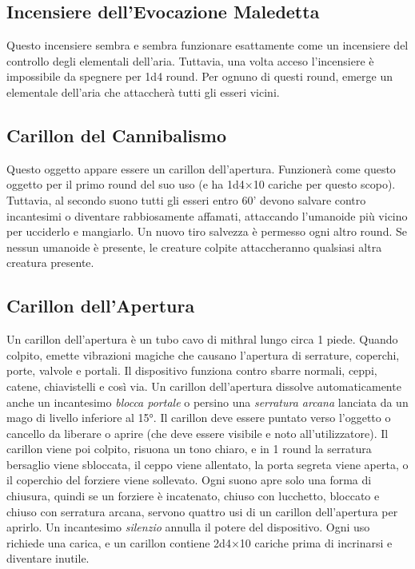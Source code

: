 \documentclass{article}
\begin{document}
\begin{multicols}{2}
\subsection{Incensiere dell'Evocazione Maledetta}
Questo incensiere sembra e sembra funzionare esattamente come un incensiere del controllo degli elementali dell'aria. Tuttavia, una volta acceso l'incensiere è impossibile da spegnere per 1d4 round. Per ognuno di questi round, emerge un elementale dell'aria che attaccherà tutti gli esseri vicini.

\subsection{Carillon del Cannibalismo}
Questo oggetto appare essere un carillon dell'apertura. Funzionerà come questo oggetto per il primo round del suo uso (e ha 1d4×10 cariche per questo scopo). Tuttavia, al secondo suono tutti gli esseri entro 60' devono salvare contro incantesimi o diventare rabbiosamente affamati, attaccando l'umanoide più vicino per ucciderlo e mangiarlo. Un nuovo tiro salvezza è permesso ogni altro round. Se nessun umanoide è presente, le creature colpite attaccheranno qualsiasi altra creatura presente.

\subsection{Carillon dell'Apertura}
Un carillon dell'apertura è un tubo cavo di mithral lungo circa 1 piede. Quando colpito, emette vibrazioni magiche che causano l'apertura di serrature, coperchi, porte, valvole e portali. Il dispositivo funziona contro sbarre normali, ceppi, catene, chiavistelli e così via. Un carillon dell'apertura dissolve automaticamente anche un incantesimo \textit{blocca portale} o persino una \textit{serratura arcana} lanciata da un mago di livello inferiore al 15°. Il carillon deve essere puntato verso l'oggetto o cancello da liberare o aprire (che deve essere visibile e noto all'utilizzatore). Il carillon viene poi colpito, risuona un tono chiaro, e in 1 round la serratura bersaglio viene sbloccata, il ceppo viene allentato, la porta segreta viene aperta, o il coperchio del forziere viene sollevato. Ogni suono apre solo una forma di chiusura, quindi se un forziere è incatenato, chiuso con lucchetto, bloccato e chiuso con serratura arcana, servono quattro usi di un carillon dell'apertura per aprirlo. Un incantesimo \textit{silenzio} annulla il potere del dispositivo. Ogni uso richiede una carica, e un carillon contiene 2d4×10 cariche prima di incrinarsi e diventare inutile.


\end{multicols}
\end{document}
